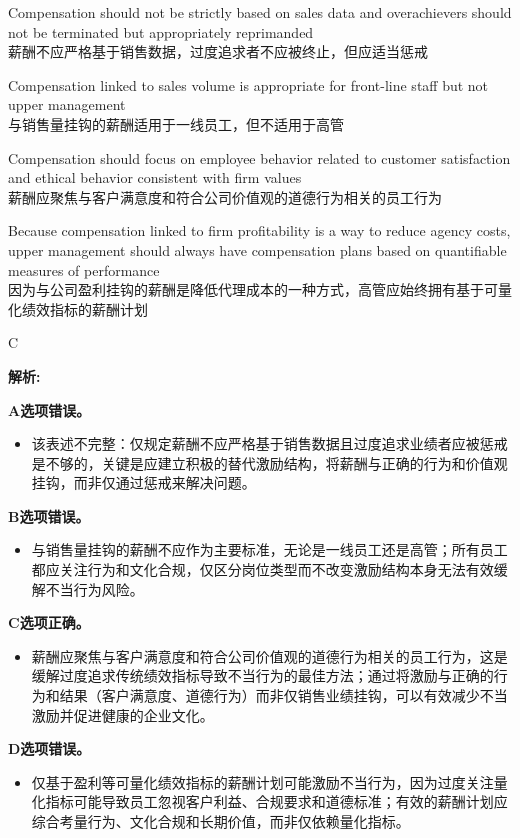 \documentclass{article}
\newenvironment{explanation}
{\textbf{解析:}\par}
{\par}
\begin{document}
\begin{choices}
    \item Compensation should not be strictly based on sales data and overachievers should not be terminated but appropriately reprimanded\\
    薪酬不应严格基于销售数据，过度追求者不应被终止，但应适当惩戒
    \item Compensation linked to sales volume is appropriate for front-line staff but not upper management\\
    与销售量挂钩的薪酬适用于一线员工，但不适用于高管
    \item Compensation should focus on employee behavior related to customer satisfaction and ethical behavior consistent with firm values\\
    薪酬应聚焦与客户满意度和符合公司价值观的道德行为相关的员工行为
    \item Because compensation linked to firm profitability is a way to reduce agency costs, upper management should always have compensation plans based on quantifiable measures of performance\\
    因为与公司盈利挂钩的薪酬是降低代理成本的一种方式，高管应始终拥有基于可量化绩效指标的薪酬计划
\end{choices}

\begin{correctanswer}
    C
\end{correctanswer}

\begin{explanation}
    \textbf{A选项错误。}
    \begin{itemize}
        \item 该表述不完整：仅规定薪酬不应严格基于销售数据且过度追求业绩者应被惩戒是不够的，关键是应建立积极的替代激励结构，将薪酬与正确的行为和价值观挂钩，而非仅通过惩戒来解决问题。
    \end{itemize}

    \textbf{B选项错误。}
    \begin{itemize}
        \item 与销售量挂钩的薪酬不应作为主要标准，无论是一线员工还是高管；所有员工都应关注行为和文化合规，仅区分岗位类型而不改变激励结构本身无法有效缓解不当行为风险。
    \end{itemize}

    \textbf{C选项正确。}
    \begin{itemize}
        \item 薪酬应聚焦与客户满意度和符合公司价值观的道德行为相关的员工行为，这是缓解过度追求传统绩效指标导致不当行为的最佳方法；通过将激励与正确的行为和结果（客户满意度、道德行为）而非仅销售业绩挂钩，可以有效减少不当激励并促进健康的企业文化。
    \end{itemize}

    \textbf{D选项错误。}
    \begin{itemize}
        \item 仅基于盈利等可量化绩效指标的薪酬计划可能激励不当行为，因为过度关注量化指标可能导致员工忽视客户利益、合规要求和道德标准；有效的薪酬计划应综合考量行为、文化合规和长期价值，而非仅依赖量化指标。
    \end{itemize}
\end{explanation}
\end{document}
